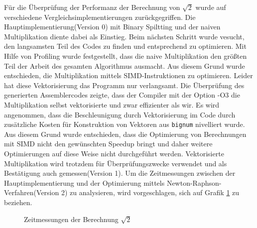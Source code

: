 \documentclass[course=erap]{aspdoc}
\begin{document}
 Für die Überprüfung der Performanz der Berechnung von $\sqrt{2}$ wurde auf verschiedene Vergleichsimplementierungen zurückgegriffen. Die Hauptimplementierung(Version 0) mit Binary Spiltting und der naiven Multiplikation diente dabei als Einstieg. Beim nächsten Schritt wurde vesucht, den langsamsten Teil des Codes zu finden und entsprechend zu optimieren. Mit Hilfe von Profiling wurde festgestellt, dass die naive Multiplikation den größten Teil der Arbeit des gesamten Algorithmus ausmacht. Aus diesem Grund wurde entschieden, die Multiplikation mittels SIMD-Instruktionen zu optimieren. Leider hat diese Vektorisierung das Programm nur verlangsamt. Die Überprüfung des generierten Assemblercodes zeigte, dass der Compiler mit der Option -O3 die Multiplikation selbst vektorisierte und zwar effizienter als wir. Es wird angenommen, dass die Beschleunigung durch Vektorisierung im Code durch zusätzliche Kosten für Konstruktion von Vektoren aus \texttt{bignum} nivelliert wurde. Aus diesem Grund wurde entschieden, dass die Optimierung von Berechnungen mit SIMD nicht den gewünschten Speedup bringt und daher weitere Optimierungen auf diese Weise nicht durchgeführt werden. Vektorisierte Multiplikation wird trotzdem für Überprüfungszwecke verwendet und als Bestätigung auch gemessen(Version 1). Um die Zeitmessungen zwischen der Hauptimplementierung und der Optimierung mittels Newton-Raphson-Verfahren(Version 2) zu analysieren, wird vorgeschlagen, sich auf Grafik \ref{chart:zeitmessungen} zu beziehen.
\begin{figure}
\caption{Zeitmessungen der Berechnung $\sqrt{2}$}
\label{chart:zeitmessungen}
\end{figure}
\end{document}

